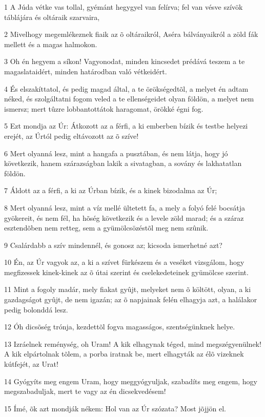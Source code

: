 \par 1 A Júda vétke vas tollal, gyémánt hegygyel van felírva; fel van vésve szívök táblájára és oltáraik szarvaira,
\par 2 Mivelhogy megemlékeznek fiaik az õ oltáraikról, Aséra bálványaikról a zöld fák mellett és a magas halmokon.
\par 3 Oh én hegyem a síkon! Vagyonodat, minden kincsedet prédává teszem a te magaslataidért, minden határodban való vétkeidért.
\par 4 És elszakíttatol, és pedig magad által, a te örökségedtõl, a melyet én adtam néked, és szolgáltatni fogom veled a te ellenségeidet olyan földön, a melyet nem ismersz; mert tûzre lobbantottátok haragomat, örökké égni fog.
\par 5 Ezt mondja az Úr: Átkozott az a férfi, a ki emberben bízik és testbe helyezi erejét, az Úrtól pedig eltávozott az õ szíve!
\par 6 Mert olyanná lesz, mint a hangafa a pusztában, és nem látja, hogy jó következik, hanem szárazságban lakik a sivatagban, a sovány és lakhatatlan földön.
\par 7 Áldott az a férfi, a ki az Úrban bízik, és a kinek bizodalma az Úr;
\par 8 Mert olyanná lesz, mint a víz mellé ültetett fa, a mely a folyó felé bocsátja gyökereit, és nem fél, ha hõség következik és a levele zöld marad; és a száraz esztendõben nem retteg, sem a gyümölcsözéstõl meg nem szûnik.
\par 9 Csalárdabb a szív mindennél, és gonosz az; kicsoda ismerhetné azt?
\par 10 Én, az Úr vagyok az, a ki a szívet fürkészem és a veséket vizsgálom, hogy megfizessek kinek-kinek az õ útai szerint és cselekedeteinek gyümölcse szerint.
\par 11 Mint a fogoly madár, mely fiakat gyûjt, melyeket nem õ költött, olyan, a ki gazdagságot gyûjt, de nem igazán; az õ napjainak felén elhagyja azt, a halálakor pedig bolonddá lesz.
\par 12 Óh dicsõség trónja, kezdettõl fogva magasságos, szentségünknek helye.
\par 13 Izráelnek reménység, oh Uram! A kik elhagynak téged, mind megszégyenülnek! A kik elpártolnak tõlem, a porba iratnak be, mert elhagyták az élõ vizeknek kútfejét, az Urat!
\par 14 Gyógyíts meg engem Uram, hogy meggyógyuljak, szabadíts meg engem, hogy megszabaduljak, mert te vagy az én dicsekvedésem!
\par 15 Ímé, õk azt mondják nékem: Hol van az Úr szózata? Most jõjjön el.
